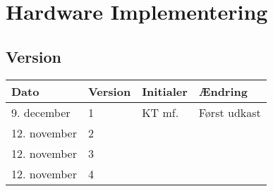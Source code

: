 \chapter{Hardware Implementering}\label{ch:hwimpl}
\section*{Version}
\begin{table}[h]
	\centering
	\begin{tabularx}{\textwidth - 2cm}{|l|l|l|X|}
	\hline
	Dato			& Version			& Initialer 		& Ændring										\\ \hline
	9. december		& 1 				& KT mf.	 		& Først udkast			\\ \hline
	12. november	& 2 				& 			 		& 			\\ \hline
	12. november	& 3 				& 			 		& 			\\ \hline
	12. november	& 4 				& 			 		& 			\\ \hline
	\end{tabularx}
\end{table}
\clearpage

\clearpage

